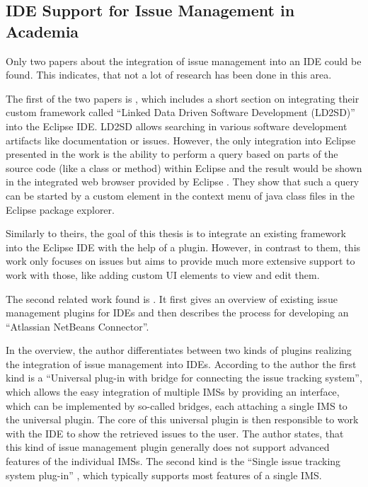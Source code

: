 \subsection{\gls{IDE} Support for Issue Management in Academia} 
\label{ssec:ch2:ss2.2}
Only two papers about the integration of issue management into an \gls{IDE} could be found.
This indicates, that not a lot of research has been done in this area.

The first of the two papers is \cite{iqbal2009integrating},
which includes a short section on integrating their custom framework called ``Linked Data Driven Software Development (LD2SD)'' 
into the \gls{Eclipse} \gls{IDE}.
LD2SD allows searching in various software development artifacts like documentation or issues.
However, the only integration into \gls{Eclipse} presented in the work is the ability to perform a query based on 
parts of the source code (like a class or method) within \gls{Eclipse} and the result would be shown in the integrated web browser provided by \gls{Eclipse} \cite{iqbal2009integrating}.
They show that such a query can be started by a custom element in the context menu of \gls{java} class files in the \gls{Eclipse} package explorer.

Similarly to theirs, the goal of this thesis is to integrate an existing framework into the \gls{Eclipse} \gls{IDE} with the help of a plugin.
However, in contrast to them, this work only focuses on issues but aims to provide much more extensive support to work with those, like adding custom \gls{UI} elements to view and edit them.

The second related work found is \cite{janak2009issue}.
It first gives an overview of existing issue management plugins for \glspl{IDE} and then describes the process for developing an ``Atlassian NetBeans Connector''.

In the overview, the author differentiates between two kinds of plugins realizing the integration of issue management into \glspl{IDE}.
According to the author the first kind is a ``Universal plug-in with bridge for connecting the issue tracking system'',
which allows the easy integration of multiple \glspl{IMS} by providing an interface, which can be implemented by so-called bridges, 
each attaching a single \gls{IMS} to the universal plugin.
The core of this universal plugin is then responsible to work with the \gls{IDE} to show the retrieved issues to the user.
The author states, that this kind of issue management plugin generally does not support advanced features of the individual \glspl{IMS}.
The second kind is the ``Single issue tracking system plug-in'' \cite{janak2009issue}, which typically supports most features of a single \gls{IMS}.

